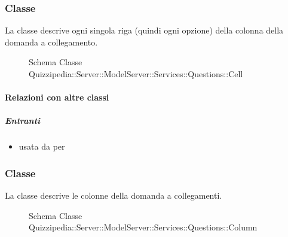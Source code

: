 \subsubsection{Classe }
La classe descrive ogni singola riga (quindi ogni opzione) della colonna della domanda a collegamento.
\begin{figure}[H]
\centering
\noindent{}
\caption[Schema Classe Cell]{Schema Classe Quizzipedia::Server::ModelServer::Services::Questions::Cell}
\end{figure}
\paragraph{Relazioni con altre classi}
\subparagraph{Entranti}
\begin{itemize}
\item usata da  per 
\end{itemize}
\subsubsection{Classe }
La classe descrive le colonne della domanda a collegamenti.
\begin{figure}[H]
\centering
\noindent{}
\caption[Schema Classe Column]{Schema Classe Quizzipedia::Server::ModelServer::Services::Questions::Column}
\end{figure}
